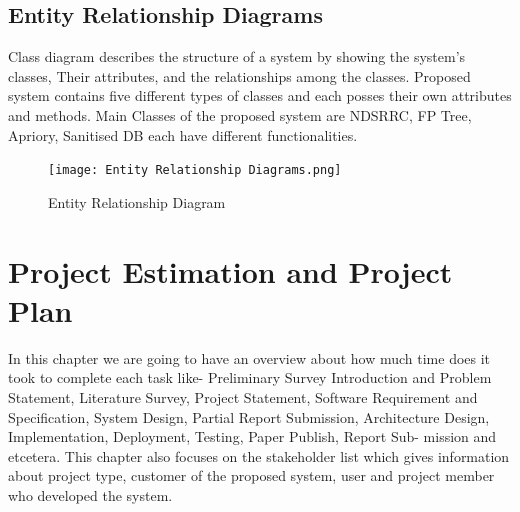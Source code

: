 \documentclass[12pt]{report}
\begin{document}
\subsection{ Entity Relationship Diagrams}
Class diagram describes the structure of a system by showing the system’s classes, Their
attributes, and the relationships among the classes. Proposed system contains five different 
types of classes and each posses their own attributes and methods. Main Classes of the 
proposed system are NDSRRC, FP Tree, Apriory, Sanitised DB each have different 
functionalities.
\vspace{1.5cm}
\begin{figure}[h]
\centering
\texttt{[image:  Entity Relationship Diagrams.png]}
\caption{ Entity Relationship Diagram
}
\label{Entity Relationship Diagram
}
\end{figure}
\clearpage
\centering
\section{ Project Estimation and Project Plan}
\justifying
\setlength{\parindent}{4em}
\setlength{\parskip}{0.5em}
\renewcommand{\baselinestretch}{1.5}
\normalsize In this chapter we are going to have an overview about how much time does it took to complete each task like- Preliminary Survey Introduction and Problem Statement, Literature Survey, Project Statement, Software Requirement and Specification, System Design, Partial Report Submission, Architecture Design, Implementation, Deployment, Testing, Paper Publish, Report Sub- mission and etcetera. This chapter also focuses on the stakeholder list which gives information about project type, customer of the proposed system, user and project member who developed the system.
\end{document}
